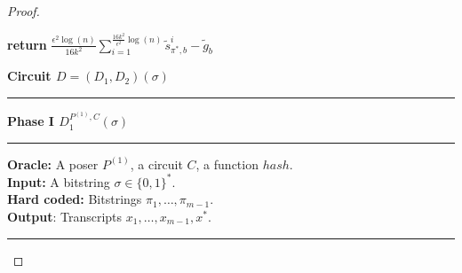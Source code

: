\begin{proof}
\begin{codeblock}
  \textbf{return} $\frac{\epsilon^2\log(n)}{16k^2} \sum_{i=1}^{\frac{16k^2}{\epsilon^2}\log(n)} \widetilde{s}_{\pi^*,b}^i - \widetilde{g}_b$\\
\end{codeblock}
%
\begin{codeblock}
  \textbf{Circuit $D = (D_1, D_2) (\sigma)$}
  \medskip \hrule \medskip
  \textbf{Phase I $D_1^{P^{(1)}, C}(\sigma)$}
  \medskip \hrule \medskip
  \textbf{Oracle:} A poser $P^{(1)}$, a circuit $C$, a function $hash$.\\
  \textbf{Input:} A bitstring $\sigma \in \{0,1\}^{*}$.\\
  \textbf{Hard coded:} Bitstrings $\pi_1, \dots, \pi_{m-1}$. \\
  \textbf{Output}: Transcripts $x_1, \dots, x_{m-1}, x^*$.
  \medskip\hrule\medskip


\end{codeblock}
\end{proof}
